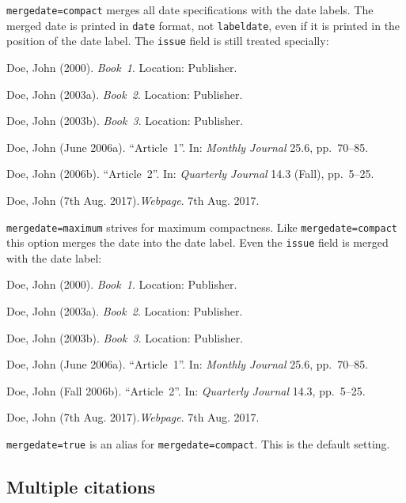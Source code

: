 \documentclass[a4paper]{article}
\newenvironment{bibsample}
  {\trivlist\samepage
   \setlength{\itemsep}{0pt}}
  {\endtrivlist}
\begin{document}
\texttt{mergedate=compact} merges all date specifications with the
date labels. The merged date is printed in \texttt{date} format,
not \texttt{labeldate}, even if it is printed in the position of
the date label. The \texttt{issue} field is still treated specially:

\begin{bibsample}
\item Doe, John (2000). \emph{Book~1}. Location: Publisher.
\item Doe, John (2003a). \emph{Book~2}. Location: Publisher.
\item Doe, John (2003b). \emph{Book~3}. Location: Publisher.
\item Doe, John (June 2006a). \enquote{Article~1}. In: \emph{Monthly Journal} 25.6, pp.~70--85.
\item Doe, John (2006b). \enquote{Article~2}. In: \emph{Quarterly Journal} 14.3
(Fall), pp.~5--25.
\item Doe, John (7th Aug. 2017).\emph{Webpage}. 7th Aug. 2017.
\end{bibsample}

\texttt{mergedate=maximum} strives for maximum compactness.
Like \texttt{mergedate=compact} this option merges the date
into the date label.
Even the \texttt{issue} field is merged with the date label:

\begin{bibsample}
\item Doe, John (2000). \emph{Book~1}. Location: Publisher.
\item Doe, John (2003a). \emph{Book~2}. Location: Publisher.
\item Doe, John (2003b). \emph{Book~3}. Location: Publisher.
\item Doe, John (June 2006a). \enquote{Article~1}. In: \emph{Monthly Journal} 25.6, pp.~70--85.
\item Doe, John (Fall 2006b). \enquote{Article~2}. In: \emph{Quarterly Journal} 14.3, pp.~5--25.
\item Doe, John (7th Aug. 2017).\emph{Webpage}. 7th Aug. 2017.
\end{bibsample}

\texttt{mergedate=true} is an alias for \texttt{mergedate=compact}.
This is the default setting.

\subsection*{Multiple citations}

\cite{knuth:ct:c,aristotle:physics,knuth:ct:b,aristotle:poetics,aristotle:rhetoric,knuth:ct:d}

\clearpage
\printbibliography
\end{document}

